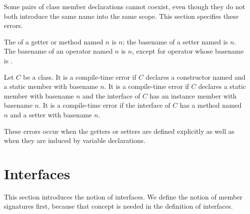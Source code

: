 \documentclass[makeidx]{article}
\begin{document}
\LMHash{}%
Some pairs of class member declarations cannot coexist,
even though they do not both introduce the same name into the same scope.
This section specifies these errors.

\LMHash{}%
The  of a getter or method named $n$ is $n$;
the basename of a setter named  is $n$.
The basename of an operator named $n$ is $n$,
except for operator \code{[]=} whose basename is \code{[]}.

\LMHash{}%
Let $C$ be a class.
It is a compile-time error if $C$
declares a constructor named  and
a static member with basename $n$.
It is a compile-time error if $C$
declares a static member with basename $n$ and
the interface of $C$ has an instance member with basename $n$.
It is a compile-time error if the interface of $C$
has a method named $n$ and a setter with basename $n$.

\LMHash{}%
These errors occur when the getters or setters are defined explicitly
as well as when they are induced by variable declarations.



\section{Interfaces}

\LMHash{}%
This section introduces the notion of interfaces.
We define the notion of member signatures first,
because that concept is needed in the definition of interfaces.

\end{document}

